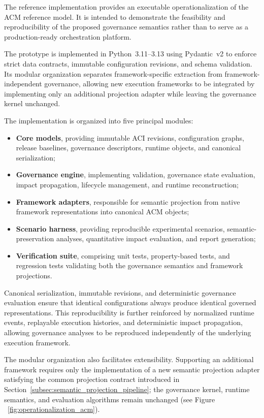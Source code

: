 \documentclass[10pt]{article}
\begin{document}
The reference implementation provides an executable operationalization of the ACM reference model. It is intended to demonstrate the feasibility and reproducibility of the proposed governance semantics rather than to serve as a production-ready orchestration platform.

The prototype is implemented in Python~3.11--3.13 using Pydantic~v2 to enforce strict data contracts, immutable configuration revisions, and schema validation. Its modular organization separates framework-specific extraction from framework-independent governance, allowing new execution frameworks to be integrated by implementing only an additional projection adapter while leaving the governance kernel unchanged.

The implementation is organized into five principal modules:

\begin{itemize}
	\item \textbf{Core models}, providing immutable ACI revisions, configuration graphs, release baselines, governance descriptors, runtime objects, and canonical serialization;
	\item \textbf{Governance engine}, implementing validation, governance state evaluation, impact propagation, lifecycle management, and runtime reconstruction;
	\item \textbf{Framework adapters}, responsible for semantic projection from native framework representations into canonical ACM objects;
	\item \textbf{Scenario harness}, providing reproducible experimental scenarios, semantic-preservation analyses, quantitative impact evaluation, and report generation;
	\item \textbf{Verification suite}, comprising unit tests, property-based tests, and regression tests validating both the governance semantics and framework projections.
\end{itemize}

Canonical serialization, immutable revisions, and deterministic governance evaluation ensure that identical configurations always produce identical governed representations. This reproducibility is further reinforced by normalized runtime events, replayable execution histories, and deterministic impact propagation, allowing governance analyses to be reproduced independently of the underlying execution framework.

The modular organization also facilitates extensibility. Supporting an additional framework requires only the implementation of a new semantic projection adapter satisfying the common projection contract introduced in Section~\ref{subsec:semantic_projection_pipeline}; the governance kernel, runtime semantics, and evaluation algorithms remain unchanged (see Figure ~\ref{fig:operationalization_acm}).
\end{document}
